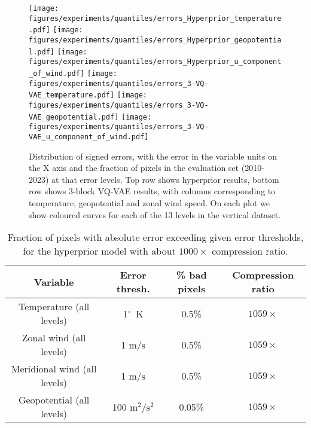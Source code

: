 \begin{figure}[t]
    \centering
    \texttt{[image: figures/experiments/quantiles/errors\_Hyperprior\_temperature.pdf]}
    \texttt{[image: figures/experiments/quantiles/errors\_Hyperprior\_geopotential.pdf]}
    \texttt{[image: figures/experiments/quantiles/errors\_Hyperprior\_u\_component\_of\_wind.pdf]}
    \texttt{[image: figures/experiments/quantiles/errors\_3-VQ-VAE\_temperature.pdf]}
    \texttt{[image: figures/experiments/quantiles/errors\_3-VQ-VAE\_geopotential.pdf]}
    \texttt{[image: figures/experiments/quantiles/errors\_3-VQ-VAE\_u\_component\_of\_wind.pdf]}
    \caption{Distribution of signed errors, with the error in the variable units on the X axis and the fraction of pixels in the evaluation set (2010-2023) at that error levels. Top row shows hyperprior results, bottom row shows 3-block VQ-VAE results, with columns corresponding to temperature, geopotential and zonal wind speed. On each plot we show coloured curves for each of the 13 levels in the vertical dataset.}
    \label{fig:error_histograms}
\end{figure}

\begin{table}[]
    \centering
    \caption{Fraction of pixels with absolute error exceeding given error thresholds, for the hyperprior model with about $1000 \times$ compression ratio.}
    \begin{tabular}{c|c|c|c}
        Variable & Error thresh. &\% bad pixels & Compression ratio \\
        \hline
        Temperature (all levels) & 1$^\circ$~K & 0.5\% & $1059 \times$ \\
        Zonal wind (all levels) & 1 $\text{m}/\text{s}$ & 0.5\% & $1059 \times$ \\
        Meridional wind (all levels) & 1 $\text{m}/\text{s}$ & 0.5\% & $1059 \times$ \\
        Geopotential (all levels) & 100 $\text{m}^2/\text{s}^2$ & 0.05\% & $1059 \times$ \\
    \end{tabular}
    
    \label{tab:percent_bad_pixels_hyper}
\end{table}

